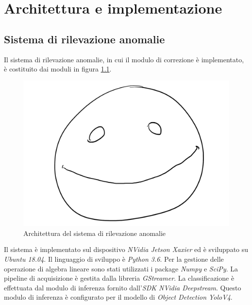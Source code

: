 \chapter{Architettura e implementazione}
\label{sec:implementazione}



\section{Sistema di rilevazione anomalie}
Il sistema di rilevazione anomalie, in cui il modulo di correzione è implementato, è costituito dai moduli in figura \ref{fig:sys modules}.
\begin{figure}
    \caption{Architettura del sistema di rilevazione anomalie}
    \label{fig:sys modules}
    \centering
    \includegraphics[width=.66\textwidth]{images/placeholder.png}
\end{figure}
Il sistema è implementato sul dispositivo \emph{NVidia Jetson Xaxier} ed è sviluppato su \emph{Ubuntu 18.04}.
Il linguaggio di sviluppo è \emph{Python 3.6}.
Per la gestione delle operazione di algebra lineare sono stati utilizzati i package \emph{Numpy} e \emph{SciPy}.
La pipeline di acquisizione è gestita dalla libreria \emph{GStreamer}.
La classificazione è effettuata dal modulo di inferenza fornito dall'\emph{SDK NVidia Deepstream}.
Questo modulo di inferenza è configurato per il modello di \emph{Object Detection YoloV4}.

